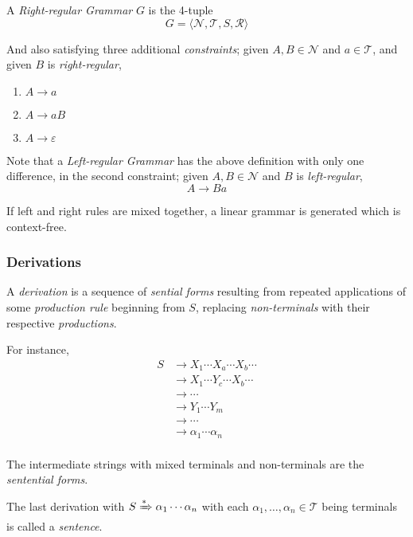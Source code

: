 \begin{definition}
    A \textit{Right-regular Grammar} $G$ is the 4-tuple
    \begin{equation}
        G = \langle
            \mathcal{N},
            \mathcal{T},
            S,
            \mathcal{R}
        \rangle
    \end{equation}
    
    And also satisfying three additional \textit{constraints}; given $A, B \in \mathcal{N}$ and $a \in \mathcal{T}$, and given $B$ is \textit{right-regular},
    \begin{enumerate}
        \item $A \to a$
        \item $A \to aB$
        \item $A \to \varepsilon$
    \end{enumerate}
\end{definition}

\begin{remark}
    Note that a \textit{Left-regular Grammar} has the above definition with only one difference, in the second constraint; given $A, B \in \mathcal{N}$ and $B$ is \textit{left-regular},
    \begin{equation}
        A \to Ba
    \end{equation}

    If left and right rules are mixed together, a linear grammar is generated which is context-free.
\end{remark}

\subsubsection{Derivations}

\begin{definition}[Derivation]
    A \textit{derivation} is a sequence of \textit{sential forms} resulting from repeated applications of some \textit{production rule} beginning from $S$, replacing \textit{non-terminals} with their respective \textit{productions}.
\end{definition}

\begin{example}
    For instance,
    \begin{align*}
        S &\to X_1 \cdots X_a \cdots X_b \cdots \\
          &\to X_1 \cdots Y_c \cdots X_b \cdots \\
          &\to \cdots \\
          &\to Y_1 \cdots Y_m \\
          &\to \cdots \\
          &\to \alpha_1 \cdots \alpha_n \\
    \end{align*}
    
    The intermediate strings with mixed terminals and non-terminals are the \textit{sentential forms}.
    
    The last derivation with $S \xRightarrow{\ast} \alpha_1 \cdots \alpha_n$ with each $\alpha_1, \dots, \alpha_n \in \mathcal{T}$ being terminals is called a \textit{sentence}.
\end{example}

